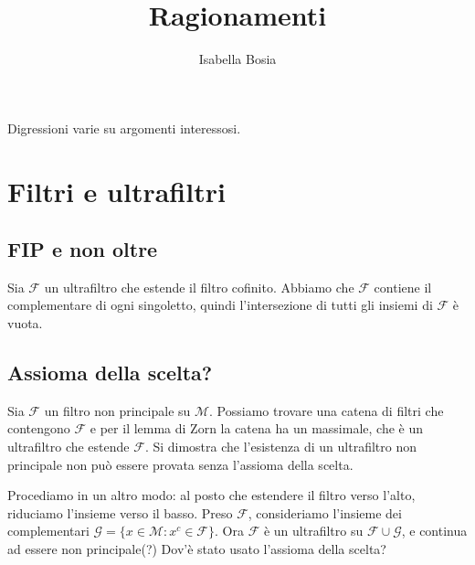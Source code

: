 \documentclass[10pt]{article}
\title{Ragionamenti}
\author{Isabella Bosia}
\date{}
\theoremstyle{definition}
\begin{document}
\maketitle

Digressioni varie su argomenti interessosi.

\section{Filtri e ultrafiltri}

\subsection{FIP e non oltre}

Sia $\mathcal F$ un ultrafiltro che estende il filtro cofinito. Abbiamo che $\mathcal F$ contiene il complementare di ogni singoletto, quindi l'intersezione di tutti gli insiemi di $\mathcal F$ è vuota.

\subsection{Assioma della scelta?}

Sia $\mathcal F$ un filtro non principale su $\mathcal M$. Possiamo trovare una catena di filtri che contengono $\mathcal F$ e per il lemma di Zorn la catena ha un massimale, che è un ultrafiltro che estende $\mathcal F$. Si dimostra che l'esistenza di un ultrafiltro non principale non può essere provata senza l'assioma della scelta.

Procediamo in un altro modo: al posto che estendere il filtro verso l'alto, riduciamo l'insieme verso il basso. Preso $\mathcal F$, consideriamo l'insieme dei complementari $\mathcal G=\{x\in\mathcal M:x^c\in\mathcal F\}$. Ora $\mathcal F$ è un ultrafiltro su $\mathcal F\cup\mathcal G$, e continua ad essere non principale(?) Dov'è stato usato l'assioma della scelta?
\end{document}
